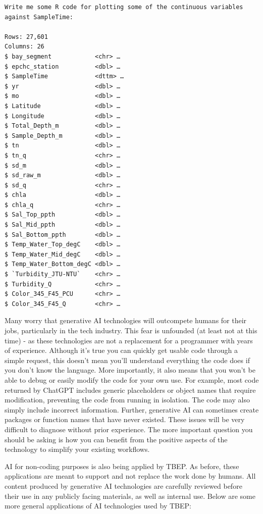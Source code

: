 \documentclass[
]{book}
\begin{document}
\begin{verbatim}
Write me some R code for plotting some of the continuous variables
against SampleTime:

Rows: 27,601
Columns: 26
$ bay_segment            <chr> …
$ epchc_station          <dbl> …
$ SampleTime             <dttm> …
$ yr                     <dbl> …
$ mo                     <dbl> …
$ Latitude               <dbl> …
$ Longitude              <dbl> …
$ Total_Depth_m          <dbl> …
$ Sample_Depth_m         <dbl> …
$ tn                     <dbl> …
$ tn_q                   <chr> …
$ sd_m                   <dbl> …
$ sd_raw_m               <dbl> …
$ sd_q                   <chr> …
$ chla                   <dbl> …
$ chla_q                 <chr> …
$ Sal_Top_ppth           <dbl> …
$ Sal_Mid_ppth           <dbl> …
$ Sal_Bottom_ppth        <dbl> …
$ Temp_Water_Top_degC    <dbl> …
$ Temp_Water_Mid_degC    <dbl> …
$ Temp_Water_Bottom_degC <dbl> …
$ `Turbidity_JTU-NTU`    <chr> …
$ Turbidity_Q            <chr> …
$ Color_345_F45_PCU      <chr> …
$ Color_345_F45_Q        <chr> …
\end{verbatim}

Many worry that generative AI technologies will outcompete humans for their jobs, particularly in the tech industry. This fear is unfounded (at least not at this time) - as these technologies are not a replacement for a programmer with years of experience. Although it's true you can quickly get usable code through a simple request, this doesn't mean you'll understand everything the code does if you don't know the language. More importantly, it also means that you won't be able to debug or easily modify the code for your own use. For example, most code returned by ChatGPT includes generic placeholders or object names that require modification, preventing the code from running in isolation. The code may also simply include incorrect information. Further, generative AI can sometimes create packages or function names that have never existed. These issues will be very difficult to diagnose without prior experience. The more important question you should be asking is how you can benefit from the positive aspects of the technology to simplify your existing workflows.

AI for non-coding purposes is also being applied by TBEP. As before, these applications are meant to support and not replace the work done by humans. All content produced by generative AI technologies are carefully reviewed before their use in any publicly facing materials, as well as internal use. Below are some more general applications of AI technologies used by TBEP:
\end{document}
